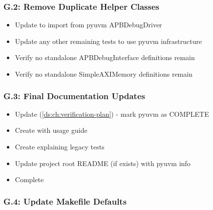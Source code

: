 \subsubsection{G.2: Remove Duplicate Helper Classes}\label{cr:status:pyuvm-migration:g2-remove-duplicate-helper-classes}

\begin{record}

\begin{itemize}
\tightlist
\item[$\square$]
  Update  to import from pyuvm APBDebugDriver
\item[$\square$]
  Update any other remaining tests to use pyuvm infrastructure
\item[$\square$]
  Verify no standalone APBDebugInterface definitions remain
\item[$\square$]
  Verify no standalone SimpleAXIMemory definitions remain
\end{itemize}

\end{record}

\subsubsection{G.3: Final Documentation Updates}\label{cr:status:pyuvm-migration:g3-final-documentation-updates}

\begin{record}

\begin{itemize}
\tightlist
\item[$\square$]
  Update  (\cref{ds:ch:verification-plan}) - mark pyuvm as
  COMPLETE
\item[$\square$]
  Create  with usage guide
\item[$\square$]
  Create  explaining legacy tests
\item[$\square$]
  Update project root README (if exists) with pyuvm info
\item[$\square$]
  Complete 
\end{itemize}

\end{record}

\subsubsection{G.4: Update Makefile Defaults}\label{cr:status:pyuvm-migration:g4-update-makefile-defaults}

